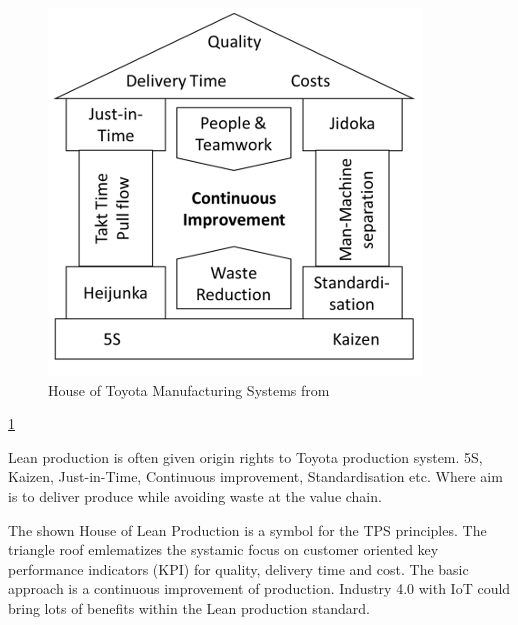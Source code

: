 \documentclass[article,a4paper]{IEEEtran}
\begin{document}
    \begin{figure}
        \includegraphics[width=\columnwidth]{HouseofToyota.png} 
        \caption{House of Toyota Manufacturing Systems from \cite{Impact_Lean_Prod}}
        \label{fig1:House of Toyota Manufacturing System}   
    \end{figure}
    \ref{fig1:House of Toyota Manufacturing System}
    
    Lean production is often given origin rights to Toyota production system. 5S, Kaizen, Just-in-Time, Continuous improvement, Standardisation etc. Where aim is to deliver produce while avoiding waste at the value chain. 
    
    The shown House of Lean Production is a symbol for the TPS principles. The triangle roof emlematizes the systamic focus on customer oriented key performance indicators (KPI) for quality, delivery time and cost. The basic approach is a continuous improvement of production. Industry 4.0 with IoT could bring lots of benefits within the Lean production standard. \cite{Impact_Lean_Prod}
    \newline\newline
    
\end{document}
